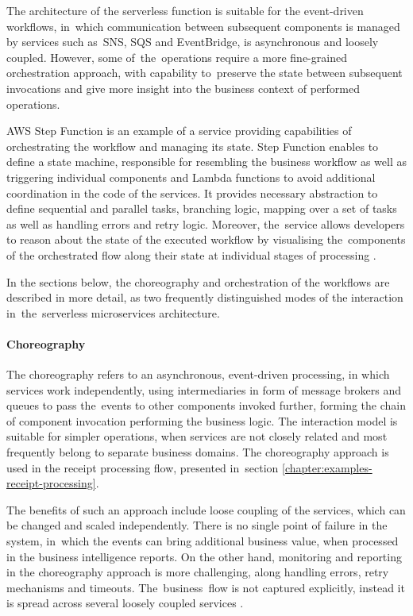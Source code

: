 The architecture of the serverless function is suitable for the event-driven workflows, in~which communication between subsequent components is managed by services such as~SNS, SQS and EventBridge, is asynchronous and loosely coupled.
However, some of~the~operations require a more fine-grained orchestration approach, with capability to~preserve the state between subsequent invocations and give more insight into the business context of performed operations.

AWS Step Function is an example of a service providing capabilities of orchestrating the workflow and managing its state.
Step Function enables to define a state machine, responsible for resembling the business workflow as well as triggering individual components and Lambda functions to avoid additional coordination in the code of the services.
It provides necessary abstraction to define sequential and parallel tasks, branching logic, mapping over a set of tasks as well as handling errors and retry logic.
Moreover, the~service allows developers to reason about the state of the executed workflow by visualising the~components of the orchestrated flow along their state at individual stages of processing \cite{ImplementingMicroservicesOnAWS}.

In the sections below, the choreography and orchestration of the workflows are described in more detail, as two frequently distinguished modes of the interaction in~the~serverless microservices architecture.

\paragraph{Choreography}

The choreography refers to an asynchronous, event-driven processing, in which services work independently, using intermediaries in form of message brokers and queues to pass the~events to other components invoked further, forming the chain of component invocation performing the business logic.
The interaction model is suitable for simpler operations, when services are not closely related and most frequently belong to separate business domains.
The choreography approach is used in the receipt processing flow, presented in~section \ref{chapter:examples-receipt-processing}.

The benefits of such an approach include loose coupling of the services, which can be changed and scaled independently. There is no single point of failure in the system, in~which the events can bring additional business value, when processed in the business intelligence reports.
On the other hand, monitoring and reporting in the choreography approach is more challenging, along handling errors, retry mechanisms and timeouts. The~business~flow is not captured explicitly, instead it is spread across several loosely coupled services \cite{ChoreographyVsOrchestrationInServerlessMicroservices}.

